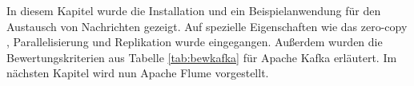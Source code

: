 
In diesem Kapitel wurde die Installation und ein Beispielanwendung für den Austausch von Nachrichten gezeigt. Auf spezielle Eigenschaften wie das zero-copy , Parallelisierung und Replikation wurde eingegangen. Außerdem wurden die Bewertungskriterien aus Tabelle \ref{tab:bewkafka} für Apache Kafka erläutert. Im nächsten Kapitel wird nun Apache Flume vorgestellt.


